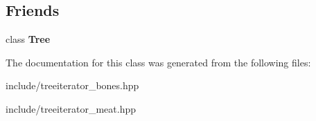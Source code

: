 \subsection*{Friends}
\begin{DoxyCompactItemize}
\item 
class {\bfseries Tree}\hypertarget{classTreeIterator_a4b682814d14447120dd184fd300deade}{}\label{classTreeIterator_a4b682814d14447120dd184fd300deade}

\end{DoxyCompactItemize}


The documentation for this class was generated from the following files\+:\begin{DoxyCompactItemize}
\item 
include/treeiterator\+\_\+bones.\+hpp\item 
include/treeiterator\+\_\+meat.\+hpp\end{DoxyCompactItemize}
